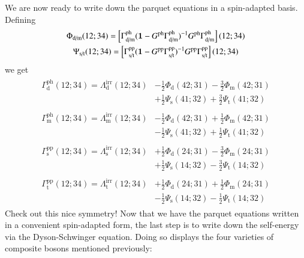 \documentclass[aip,jcp,reprint,noshowkeys,superscriptaddress]{revtex4-1}
\newcommand{\bI}{\boldsymbol{1}}
\newcommand{\ph}{\text{ph}}
\newcommand{\pp}{\text{pp}}
\newcommand{\irr}{\text{irr}}
\begin{document}
We are now ready to write down the parquet equations in a spin-adapted basis.
Defining
\begin{gather}
	\Phi_\text{d/m}(12;34) = \qty[ \Gamma_\text{d/m}^\ph (\bI - G^\ph \Gamma_\text{d/m}^\ph)^{-1} G^\ph \Gamma_\text{d/m}^\ph ](12;34)
	\\
	\Psi_\text{s/t}(12;34) = \qty[ \Gamma_\text{s/t}^\pp (\bI - G^\pp \Gamma_\text{s/t}^\pp)^{-1} G^\pp \Gamma_\text{s/t}^\pp ](12;34)
\end{gather}
we get
\begin{align}
	\begin{split}
		\Gamma_\text{d}^\ph(12;34) 
		= \Lambda_\text{d}^\irr(12;34) 
		& - \frac{1}{2} \Phi_\text{d}(42;31) 
		- \frac{3}{2} \Phi_\text{m}(42;31)
		\\
		& + \frac{1}{2} \Psi_\text{s}(41;32) 
		+ \frac{3}{2} \Psi_\text{t}(41;32)
	\end{split}
	\\
	\begin{split}
		\Gamma_\text{m}^\ph(12;34) 
		= \Lambda_\text{m}^\irr(12;34) 
		& - \frac{1}{2} \Phi_\text{d}(42;31) 
		+ \frac{1}{2} \Phi_\text{m}(42;31)
		\\
		& - \frac{1}{2} \Psi_\text{s}(41;32) 
		+ \frac{1}{2} \Psi_\text{t}(41;32)
	\end{split}
	\\
	\begin{split}
		\Gamma_\text{s}^\pp(12;34) 
		= \Lambda_\text{s}^\irr(12;34) 
		& + \frac{1}{2} \Phi_\text{d}(24;31) 
		- \frac{3}{2} \Phi_\text{m}(24;31)
		\\
		& + \frac{1}{2} \Psi_\text{s}(14;32) 
		- \frac{3}{2} \Psi_\text{t}(14;32)
	\end{split}
	\\
	\begin{split}
		\Gamma_\text{t}^\pp(12;34) 
		= \Lambda_\text{t}^\irr(12;34) 
		& + \frac{1}{2} \Phi_\text{d}(24;31) 
		+ \frac{1}{2} \Phi_\text{m}(24;31)
		\\
		& - \frac{1}{2} \Psi_\text{s}(14;32) 
		- \frac{1}{2} \Psi_\text{t}(14;32)
	\end{split}
\end{align}
Check out this nice symmetry!
Now that we have the parquet equations written in a convenient spin-adapted form, the last step is to write down the self-energy via the Dyson-Schwinger equation.
Doing so displays the four varieties of composite bosons mentioned previously:
\end{document}
